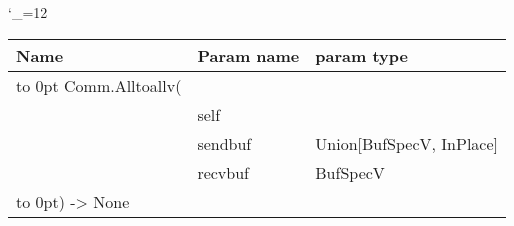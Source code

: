 \begingroup \catcode`\_=12 \tt
\begin{tabular}{lll}
\toprule
\textrm{Name}&\textrm{Param name}&\textrm{param type}\\
\midrule
\hbox to 0pt {Comm.Alltoallv(\hss}\\
& self\\
& sendbuf & Union[BufSpecV, InPlace]\\
& recvbuf & BufSpecV\\
\hbox to 0pt{) -> None\hss}\\
\bottomrule
\end{tabular}
\endgroup
